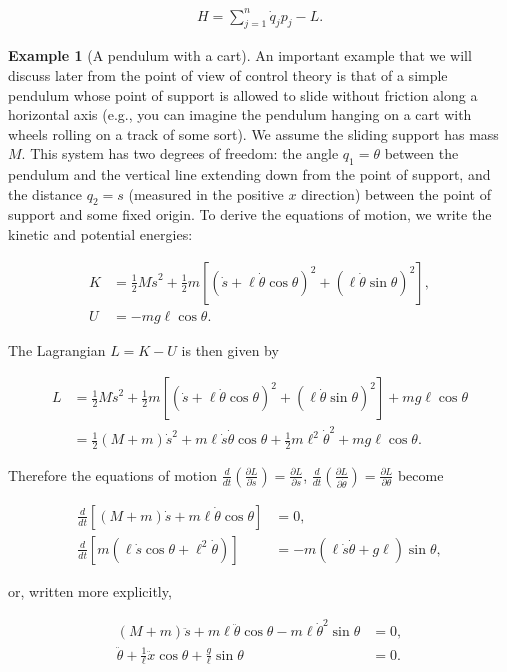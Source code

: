\documentclass[11pt]{report}
\theoremstyle{plain}
\theoremstyle{definition}
\newtheorem{example}[thm]{Example}
\begin{document}
\begin{align*}
H = \sum_{j=1}^n \dot{q}_j p_j - L.
\end{align*}

\begin{example}[A pendulum with a cart]
An important example that we will discuss later from
the point of view of control theory is that of a
simple pendulum whose point of support is allowed to
slide without friction along a horizontal axis (e.g.,
you can imagine the pendulum hanging on a cart with
wheels rolling on a track of some sort). We assume the
sliding support has mass $M$. This system has two
degrees of freedom: the angle $q_1 = \theta$ between
the pendulum and the vertical line extending down from
the point of support, and the distance $q_2 = s$
(measured in the positive $x$ direction) between the
point of support and some fixed origin. To derive the
equations of motion, we write the kinetic and
potential energies:

\begin{align*}
K &= \tfrac12 M \dot{s}^2 + \tfrac12 m \left[ \left(\dot{s}+\ell \dot{\theta} \cos \theta \right)^2 + \left(\ell \dot{\theta} \sin \theta \right)^2 \right], \\
U &= -mg \ell \cos \theta.
\end{align*}

The Lagrangian $L=K-U$ is then given by

\begin{align*}
L &=
\tfrac12 M \dot{s}^2 + \tfrac12 m \left[ \left(\dot{s}+\ell \dot{\theta} \cos \theta \right)^2 + \left(\ell \dot{\theta} \sin \theta \right)^2 \right] + mg \ell \cos \theta \\
&= \tfrac12(M+m)\dot{s}^2 + m\ell \dot{s} \dot{\theta} \cos \theta + \tfrac12 m \ell^2 \dot{\theta}^2 + mg\ell \cos\theta.
\end{align*}

Therefore the equations of motion
$\frac{d}{dt}\left(\frac{\partial L}{\partial
\dot{s}}\right)=\frac{\partial L}{\partial s}$,
$\frac{d}{dt}\left(\frac{\partial L}{\partial
\dot{\theta}}\right)=\frac{\partial L}{\partial
\theta}$
become

\begin{align*}
\frac{d}{dt}\left[ (M+m)\dot{s} + m\ell\dot{\theta}\cos \theta \right] &= 0, \\
\frac{d}{dt}\left[m(\ell \dot{s}  \cos\theta + \ell^2 \dot{\theta})\right] &= -m(\ell\dot{s} \dot{\theta} + g\ell)\sin \theta,
\end{align*}

or, written more explicitly,

\begin{align*}
(M+m)\ddot{s} + m\ell \ddot{\theta} \cos \theta -m\ell \dot{\theta}^2 \sin\theta &= 0, \\
\ddot{\theta} + \frac{1}{\ell}\ddot{x} \cos\theta + \frac{g}{\ell}  \sin\theta &= 0.
\end{align*}

\end{example}
\end{document}
